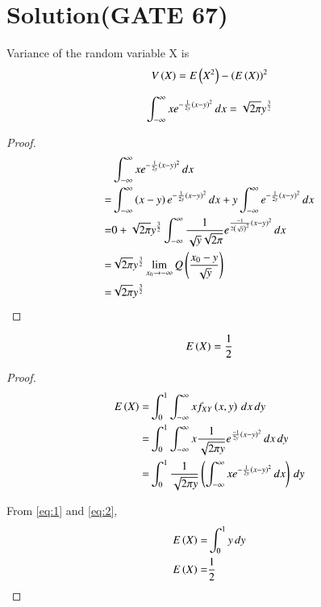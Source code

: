 \documentclass[journal,12pt,twocolumn]{IEEEtran}
\begin{document}
\section*{\textbf{Solution(GATE 67)}}
Variance of the random variable X is
\begin{align}
 V\left(X\right) = E\left(X^2\right)-\left(E\left(X\right)\right)^2   
\end{align}
\begin{lemma}
\begin{align}
    \int_{-\infty}^{\infty}xe^{-\frac{1}{2y}\left(x-y\right)^2}\,dx = \sqrt{2\pi}y^\frac{3}{2}
\end{align}
\end{lemma}
\begin{proof}
\begin{align}
    &\int_{-\infty}^{\infty}xe^{-\frac{1}{2y}\left(x-y\right)^2}\,dx\\
  =&\int_{-\infty}^{\infty}\left(x-y\right)e^{-\frac{1}{2y}\left(x-y\right)^2}\,dx+y\int_{-\infty}^{\infty}e^{-\frac{1}{2y}\left(x-y\right)^2}\,dx\\
 =&0+\sqrt{2\pi}y^{\frac{3}{2}}\int_{-\infty}^{\infty}\frac{1}{\sqrt{y}\sqrt{2\pi}}e^{\frac{-1}{2\left(\sqrt{y}\right)^2}\left(x-y\right)^2}\,dx\\
 =&\sqrt{2\pi}y^\frac{3}{2}\lim_{x_0 \to -\infty}Q\left(\frac{x_0 - y}{\sqrt{y}}\right)\\
  =&\sqrt{2\pi}y^\frac{3}{2} \label{eq:2}
\end{align}
\end{proof}
\begin{lemma}
\begin{align}
E\left(X\right) = \frac{1}{2}
\end{align}
\end{lemma}
\begin{proof}
\begin{align}
 E\left(X\right)=&\int_{0}^{1}\int_{-\infty}^{\infty}x f_{XY}\left(x,y\right)\,dx\,dy\\
    =&\int_{0}^{1}\int_{-\infty}^{\infty}x\frac{1}{\sqrt{2\pi y}}e^{\frac{-1}{2y}\left(x-y\right)^2}\,dx \,dy\\
     =&\int_{0}^{1}\frac{1}{\sqrt{2\pi y}}\left(\int_{-\infty}^{\infty}xe^{-\frac{1}{2y}\left(x-y\right)^2}\,dx\right)\,dy \label{eq:1}
\end{align}


From \eqref{eq:1} and \eqref{eq:2}, 
\begin{align}
E\left(X\right)=&\int_{0}^{1}y\,dy\\
E\left(X\right)=&\frac{1}{2} \label{eq:3}
\end{align}
\end{proof}
\end{document}
